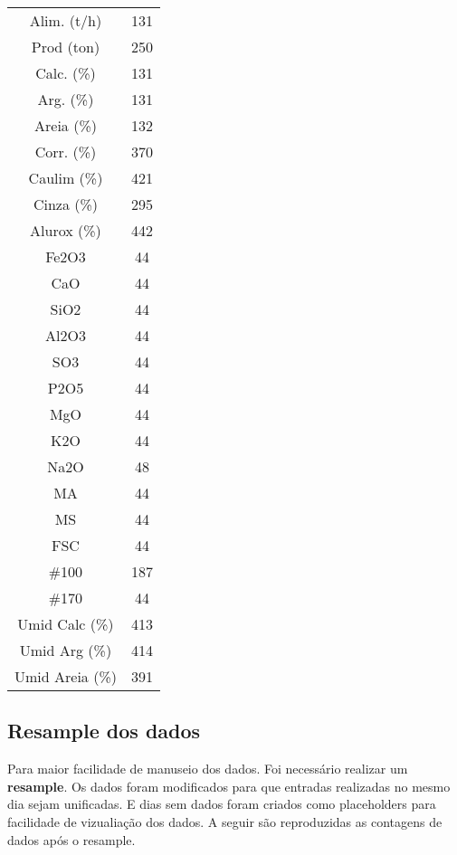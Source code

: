 \documentclass[a4paper]{article}
\begin{document}
\newpage

\begin{center}
\begin{tabular}{ c c }
Alim. (t/h)       & 131\\
Prod (ton)        & 250\\
Calc. (\%)        & 131\\
Arg. (\%)         & 131\\
Areia (\%)        & 132\\
Corr. (\%)        & 370\\
Caulim (\%)       & 421\\
Cinza (\%)        & 295\\
Alurox (\%)       & 442\\
Fe2O3             & 44\\
CaO               & 44\\
SiO2              & 44\\
Al2O3             & 44\\
SO3               & 44\\
P2O5              & 44\\
MgO              &  44\\
K2O              &  44\\
Na2O             &  48\\
MA               &  44\\
MS               &  44\\
FSC              &  44\\
\#100             & 187\\
\#170             &  44\\
Umid Calc (\%)   &  413\\
Umid Arg (\%)    &  414 \\
Umid Areia (\%) &    391 \\
\end{tabular}
\end{center}




\subsection{Resample dos dados}
Para maior facilidade de manuseio dos dados. Foi necessário realizar um \textbf{resample}. Os dados foram modificados para que entradas realizadas no mesmo dia sejam unificadas. E dias sem dados foram criados como placeholders para facilidade de vizualiação dos dados. A seguir são reproduzidas as contagens de dados após o resample.
\end{document}
